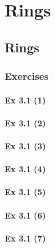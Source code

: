 \setcounter{chapter}{0}
\renewcommand{\thechapter}{3}
\chapter{Rings}\label{ch:3}
\setcounter{equation}{0}	        %

\section{Rings}\label{sec:3.1}
\subsection{Exercises}\label{sec:3.1_Exercises}

\subsubsection{Ex 3.1 (1)}\label{sec:Ex_3.1.1}

\subsubsection{Ex 3.1 (2)}\label{sec:Ex_3.1.2}

\subsubsection{Ex 3.1 (3)}\label{sec:Ex_3.1.3}

\subsubsection{Ex 3.1 (4)}\label{sec:Ex_3.1.4}

\subsubsection{Ex 3.1 (5)}\label{sec:Ex_3.1.5}

\subsubsection{Ex 3.1 (6)}\label{sec:Ex_3.1.6}

\subsubsection{Ex 3.1 (7)}\label{sec:Ex_3.1.7}

